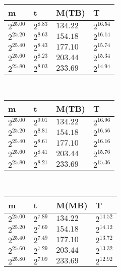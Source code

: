 
 \ 
\begin{tabular}{llll}
m & t & M(TB) & T \\ \hline
$2^{25.00}$ & $2^{8.83}$ & $134.22$ & $2^{16.54}$ \\
$2^{25.20}$ & $2^{8.63}$ & $154.18$ & $2^{16.14}$ \\
$2^{25.40}$ & $2^{8.43}$ & $177.10$ & $2^{15.74}$ \\
$2^{25.60}$ & $2^{8.23}$ & $203.44$ & $2^{15.34}$ \\
$2^{25.80}$ & $2^{8.03}$ & $233.69$ & $2^{14.94}$ \\
\end{tabular}
 \ 
\begin{tabular}{llll}
m & t & M(TB) & T \\ \hline
$2^{25.00}$ & $2^{9.01}$ & $134.22$ & $2^{16.96}$ \\
$2^{25.20}$ & $2^{8.81}$ & $154.18$ & $2^{16.56}$ \\
$2^{25.40}$ & $2^{8.61}$ & $177.10$ & $2^{16.16}$ \\
$2^{25.60}$ & $2^{8.41}$ & $203.44$ & $2^{15.76}$ \\
$2^{25.80}$ & $2^{8.21}$ & $233.69$ & $2^{15.36}$ \\
\end{tabular}
 \ 
\begin{tabular}{llll}
m & t & M(MB) & T \\ \hline
$2^{25.00}$ & $2^{7.89}$ & $134.22$ & $2^{14.52}$ \\
$2^{25.20}$ & $2^{7.69}$ & $154.18$ & $2^{14.12}$ \\
$2^{25.40}$ & $2^{7.49}$ & $177.10$ & $2^{13.72}$ \\
$2^{25.60}$ & $2^{7.29}$ & $203.44$ & $2^{13.32}$ \\
$2^{25.80}$ & $2^{7.09}$ & $233.69$ & $2^{12.92}$ \\
\end{tabular}
